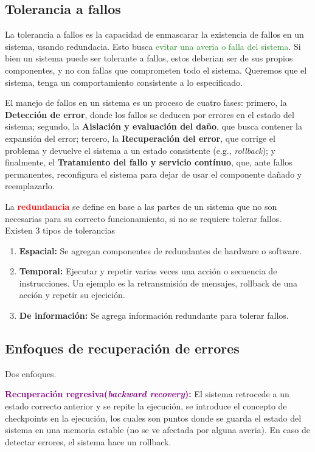 \subsection{Tolerancia a fallos}
La tolerancia a fallos es \textcolor{Sepia}{la capacidad de enmascarar la existencia de fallos} en un sistema, usando redundacia. Esto busca \textcolor{ForestGreen}{evitar una averia o falla del sistema}. Si bien un sistema puede ser tolerante a fallos, estos deberian ser de sus propios componentes, y no con fallas que comprometen todo el sistema. Queremos que el sistema, tenga un comportamiento consistente a lo especificado.
\vspace{1mm}

El \textcolor{Sepia}{manejo de fallos en un sistema es un proceso de cuatro fases}: primero, la \textbf{Detección de error}, donde los fallos se deducen por errores en el estado del sistema; segundo, la \textbf{Aislación y evaluación del daño}, que busca contener la expansión del error; tercero, la \textbf{Recuperación del error}, que corrige el problema y devuelve el sistema a un estado consistente (e.g., \textit{rollback}); y finalmente, el \textbf{Tratamiento del fallo y servicio contínuo}, que, ante fallos permanentes, reconfigura el sistema para dejar de usar el componente dañado y reemplazarlo.

La \textcolor{red}{\textbf{redundancia}} se define en base a las partes de un sistema que no son necesarias para su correcto funcionamiento, si no se requiere tolerar fallos. Existen 3 tipos de tolerancias
\begin{enumerate}
    \item \textbf{Espacial:} Se agregan componentes de redundantes de hardware o software.
    \item \textbf{Temporal:} Ejecutar y repetir varias veces una acción o secuencia de instrucciones. Un ejemplo es la retransmisión de mensajes, rollback de una acción y repetir su ejecición.
    \item \textbf{De información:} Se agrega información redundante para tolerar fallos.
\end{enumerate} 

\subsection{Enfoques de recuperación de errores}
Dos enfoques.

\textcolor{purple}{\textbf{Recuperación regresiva(\textit{backward recovery}):}} El sistema retrocede a un estado correcto anterior y se repite la ejecución, se introduce el concepto de checkpoints en la ejecución, los cuales son puntos donde se guarda el estado del sistema en una memoria estable
(no se ve afectada por alguna averia). En caso de detectar errores, el sistema hace un rollback.

